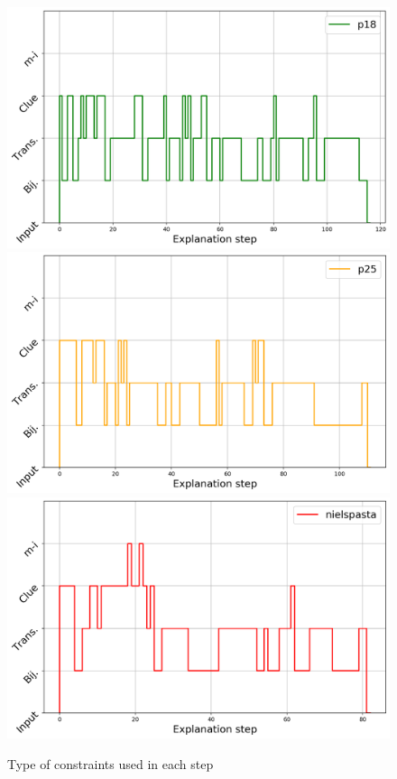 % 
\begin{figure}[t]
\centering
\includegraphics[width=0.32\linewidth]{figures/plot_cost_steps_p18}
\includegraphics[width=0.32\linewidth]{figures/plot_cost_steps_p25}
\includegraphics[width=0.32\linewidth]{figures/plot_cost_steps_nielspasta}\caption{Type of constraints used in each step}
\label{fig:steps}
\end{figure}

